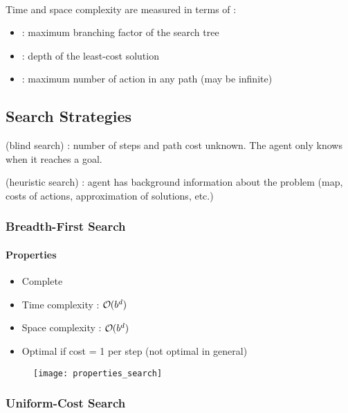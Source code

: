 \\
Time and space complexity are measured in terms of :
\begin{itemize}
\item {} : maximum branching factor of the search tree
\item {} : depth of the least-cost solution
\item {} : maximum number of action in any path (may be infinite)
\end{itemize}

\subsection{Search Strategies}

 (blind search) : number of steps and path cost unknown. The agent only knows when it reaches a goal.

 (heuristic search) : agent has background information about the problem (map, costs of actions, approximation of solutions, etc.)

\subsubsection{Breadth-First Search}

\paragraph{Properties}
\begin{minipage}{0.6\textwidth}
	\begin{itemize}
	\item Complete
	\item Time complexity : $\bigO (b^d)$
	\item Space complexity : $\bigO (b^d)$
	\item Optimal if cost = 1 per step (not optimal in general)
	\end{itemize}
\end{minipage}
\begin{minipage}{0.4\textwidth}
	\begin{figure}[H]
		\centering
    		\texttt{[image: properties\_search]}
	\end{figure}
\end{minipage}

\subsubsection{Uniform-Cost Search}

